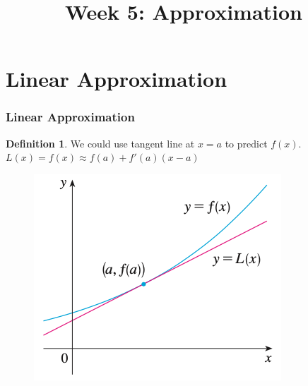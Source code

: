 \documentclass[t]{beamer}
\title{Week 5:  Approximation}
\theoremstyle{plain}
\theoremstyle{definition}
\newtheorem{dfn}{Definition}
\begin{document}
\frame{\titlepage}

\setcounter{tocdepth}{2}
\frame{\tableofcontents
}


\section{Linear Approximation}

\frame
{
\frametitle{Linear Approximation}

\begin{dfn}
We could use tangent line at $x=a$ to predict $f(x)$.
\centering
$L(x) = f(x) \approx f(a) + f'(a)(x-a)$
\vspace{0.2em}
\end{dfn}

\begin{figure}[t]
\begin{center}
\includegraphics[scale=0.4]{fig/linearapprox}
\end{center}
\end{figure}

}
\end{document}

